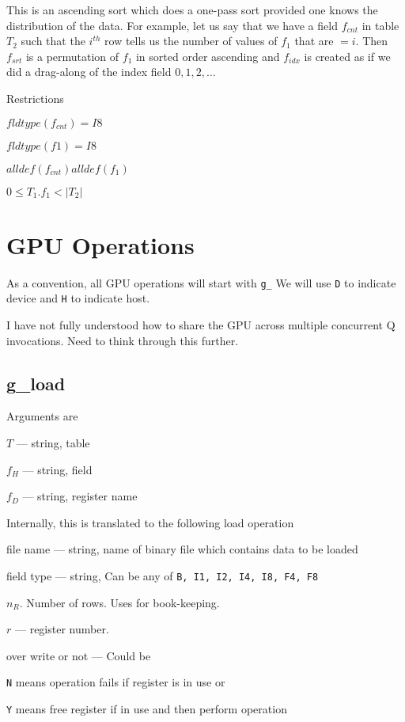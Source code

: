 \documentclass{report}
\begin{document}
This is an ascending sort which does a one-pass sort provided one knows
the distribution of the data. For example, let us say that we have a
field \(f_{cnt}\) in table \(T_2\) such that the \(i^{th}\) row 
tells us the number of values of \(f_1\) that are \(= i\).
Then \(f_{srt}\) is a permutation of
\(f_1\) in sorted order ascending and \(f_{idx}\) is created as if we did a
drag-along of the index field \(0, 1, 2, \ldots\)

Restrictions
\be
\item \(fldtype(f_{cnt}) = I8\)
\item \(fldtype(f1) = I8\)
\item \(alldef(f_{cnt}) alldef(f_1)\)
\item \(0 \leq T_1.f_1 < |T_2| \)
\ee

\section{GPU Operations}

As a convention, all GPU operations will start with \verb+g_+
We will use {\tt D} to indicate device and {\tt H} to indicate host.

I have not fully understood how to share the GPU across multiple
concurrent Q invocations. Need to think through this further. 

\subsection{g\_load}
\label{g_load}

Arguments are 
\be
\item \(T\)   --- string, table
\item \(f_H\) --- string, field
\item \(f_D\) --- string, register name 
\ee

Internally, this is translated to the following load operation
\be
\item file name ---  string, name of binary file which contains data 
to be loaded
\item field type --- string, Can be any of \verb+B, I1, I2, I4, I8, F4, F8+
\item \(n_R\). Number of rows. Uses for book-keeping.
\item \(r\) --- register number. 
\item over write or not --- Could be 
\be
\item \verb+N+ means operation fails if register is in use or 
\item \verb+Y+ means free register if in use and then perform operation
\ee
\ee
\end{document}
